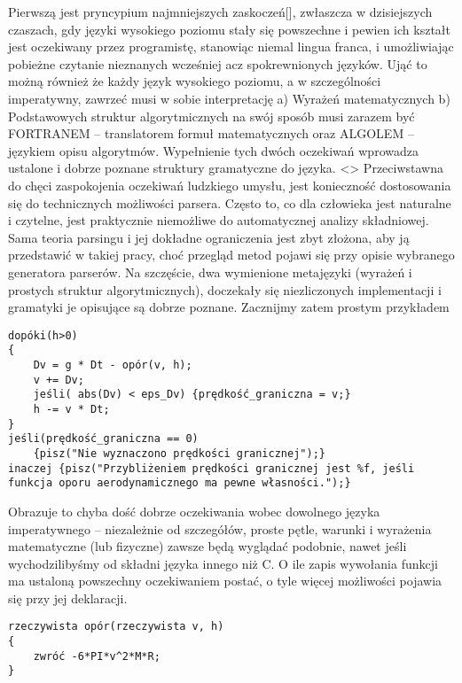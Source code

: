Pierwszą jest pryncypium najmniejszych zaskoczeń[], zwłaszcza w dzisiejszych czaszach, gdy języki wysokiego poziomu stały się powszechne i pewien ich kształt jest oczekiwany przez programistę, stanowiąc niemal lingua franca, i umożliwiając pobieżne czytanie nieznanych wcześniej acz spokrewnionych języków. Ująć to możną również  że każdy język wysokiego poziomu, a w szczególności imperatywny, zawrzeć musi w sobie interpretację
a) Wyrażeń matematycznych
b) Podstawowych struktur algorytmicznych
na swój sposób musi zarazem być FORTRANEM – translatorem formuł matematycznych oraz ALGOLEM – językiem opisu algorytmów.
Wypełnienie tych dwóch oczekiwań wprowadza ustalone i dobrze poznane struktury gramatyczne do języka. <>
Przeciwstawna do chęci zaspokojenia oczekiwań ludzkiego umysłu, jest konieczność dostosowania się do technicznych możliwości parsera. Często to, co dla człowieka jest naturalne i czytelne, jest praktycznie niemożliwe do automatycznej analizy składniowej.  Sama teoria parsingu i jej dokładne ograniczenia jest zbyt złożona, aby ją przedstawić w takiej pracy, choć przegląd metod pojawi się przy opisie wybranego generatora parserów. Na szczęście, dwa wymienione metajęzyki (wyrażeń i prostych struktur algorytmicznych), doczekały się niezliczonych implementacji i gramatyki je opisujące są dobrze poznane. Zacznijmy zatem prostym przykładem
\begin{lstlisting}
dopóki(h>0)
{
    Dv = g * Dt - opór(v, h);
    v += Dv;
    jeśli( abs(Dv) < eps_Dv) {prędkość_graniczna = v;}
    h -= v * Dt;
}
jeśli(prędkość_graniczna == 0)
    {pisz("Nie wyznaczono prędkości granicznej");}
inaczej {pisz("Przybliżeniem prędkości granicznej jest %f, jeśli funkcja oporu aerodynamicznego ma pewne własności.");}
\end{lstlisting}


Obrazuje to chyba dość dobrze oczekiwania wobec dowolnego języka imperatywnego – niezależnie od szczegółów, proste pętle, warunki i wyrażenia matematyczne (lub fizyczne) zawsze będą wyglądać podobnie, nawet jeśli wychodzilibyśmy od składni języka innego niż C.
O ile zapis wywołania funkcji ma ustaloną powszechny oczekiwaniem postać, o tyle więcej możliwości pojawia się przy jej deklaracji.
\begin{lstlisting}
rzeczywista opór(rzeczywista v, h)
{
	zwróć -6*PI*v^2*M*R;
}
\end{lstlisting}

